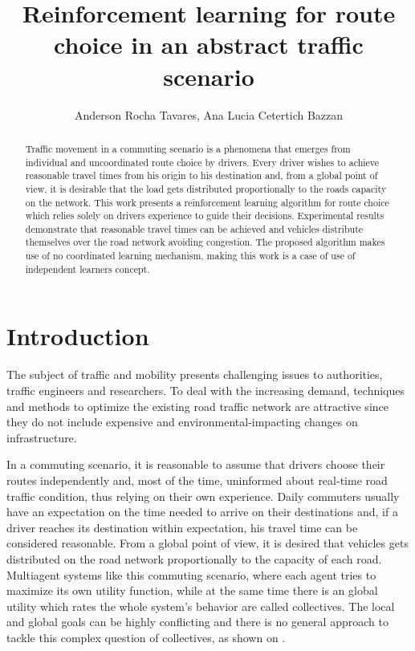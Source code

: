 \documentclass[12pt]{article}
\title{Reinforcement learning for route choice in an abstract traffic scenario}
\author{
  Anderson Rocha Tavares\inst{1}, Ana Lucia Cetertich Bazzan\inst{1}
}
\begin{document}
\maketitle

\begin{abstract}
Traffic movement in a commuting scenario is a phenomena that emerges from individual and uncoordinated route choice by drivers. Every driver wishes to achieve reasonable travel times from his origin to his destination and, from a global point of view, it is desirable that the load gets distributed proportionally to the roads capacity on the network. This work presents a reinforcement learning algorithm for route choice which relies solely on drivers experience to guide their decisions. Experimental results demonstrate that reasonable travel times can be achieved and vehicles distribute themselves over the road network avoiding congestion. The proposed algorithm makes use of no coordinated learning mechanism, making this work is a case of use of independent learners concept.
\end{abstract}





\section{Introduction}
The subject of traffic and mobility presents challenging issues to authorities, traffic engineers and researchers. To deal with the increasing demand, techniques and methods to optimize the existing road traffic network are attractive since they do not include expensive and environmental-impacting changes on infrastructure.

In a commuting scenario, it is reasonable to assume that drivers choose their routes independently and, most of the time, uninformed about real-time road traffic condition, thus relying on their own experience. Daily commuters usually have an expectation on the time needed to arrive on their destinations and, if a driver reaches its destination within expectation, his travel time can be considered  reasonable. From a global point of view, it is desired that vehicles gets distributed on the road network proportionally to the capacity of each road. Multiagent systems like this commuting scenario, where each agent tries to maximize its own utility function, while at the same time there is an global utility which rates the whole system's behavior are called collectives. The local and global goals can be highly conflicting and there is no general approach to tackle this complex question of collectives, as shown on \cite{Tumer&Wolpert2004}.
\end{document}
